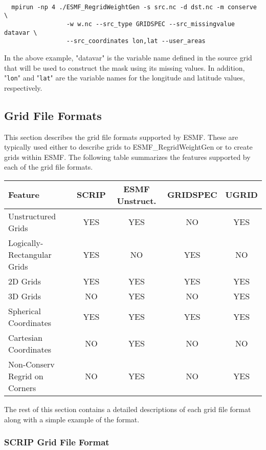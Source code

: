 \begin{verbatim}

  mpirun -np 4 ./ESMF_RegridWeightGen -s src.nc -d dst.nc -m conserve \
                 -w w.nc --src_type GRIDSPEC --src_missingvalue datavar \
                 --src_coordinates lon,lat --user_areas

\end{verbatim}

In the above example, "datavar" is the variable name defined in the source grid that will
 be used to construct the mask using its missing values.  In addition, "{\tt lon}" and "{\tt lat}" are the
variable names for the longitude and latitude values, respectively.


\subsection{Grid File Formats}

  This section describes the grid file formats supported by ESMF. These are typically used either to describe grids to ESMF\_RegridWeightGen or to create grids within ESMF. The following table summarizes the 
features supported by each of the grid file formats.

\begin{center}
\begin{tabular}{|l|c|c|c|c|}
\hline
Feature & SCRIP  & ESMF Unstruct. & GRIDSPEC & UGRID\\
\hline
Unstructured Grids            & YES & YES & NO  & YES\\
Logically-Rectangular Grids   & YES & NO  & YES & NO \\
2D Grids                      & YES & YES & YES & YES\\
3D Grids                      & NO  & YES & NO  & YES\\
Spherical Coordinates         & YES & YES & YES & YES\\
Cartesian Coordinates         & NO  & YES & NO  & NO \\
Non-Conserv Regrid on Corners & NO  & YES & NO  & YES\\
\hline
\end{tabular}
\label{fig:gridfileformatfeatures}
\end{center}


 The rest of this section contains a detailed descriptions of each grid file format along with a simple example of the format. 

\subsubsection{SCRIP Grid File Format}\label{sec:fileformat:scrip}


